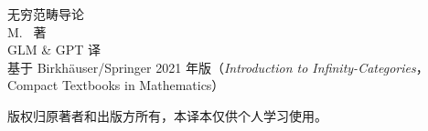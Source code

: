 \documentclass[UTF8,a4paper,zihao=-4,fontset=windows,oneside]{ctexbook}
\begin{document}
\begingroup{}
\begin{titlepage}
  \centering
  \vspace*{3cm}
  {\heiti 无穷范畴导论}\\[3cm]   %
  { M.~\trLand{} 著}\\[0.6cm]
  { GLM \& GPT 译}\\[0.6cm]
  { 基于 Birkhäuser/Springer 2021 年版（\emph{Introduction to
   Infinity-Categories}，Compact Textbooks in Mathematics）}\\[4cm]
  \begin{minipage}{0.8\textwidth}\small
    版权归原著者和出版方所有，本译本仅供个人学习使用。
  \end{minipage}
  \vfill
\end{titlepage}
\endgroup

\frontmatter
\tableofcontents

\mainmatter
\BookIndexingtrue






\appendix


\BookIndexingfalse
\backmatter

\printindex


\end{document}
